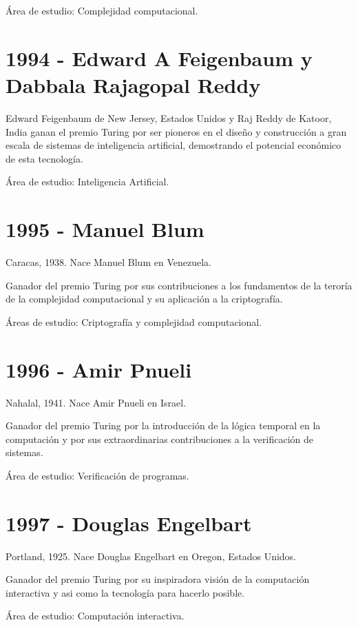 \documentclass[notitlepage,letterpaper, 11pt]{article}
\begin{document}
\noindent Área de estudio: Complejidad computacional.
\newline


\section*{1994 - Edward A Feigenbaum y Dabbala Rajagopal Reddy}
\noindent Edward Feigenbaum de New Jersey, Estados Unidos y Raj Reddy de Katoor, India ganan el premio Turing por ser pioneros en el diseño y construcción a gran escala de sistemas de inteligencia artificial, demostrando el potencial económico de esta tecnología.

\noindent Área de estudio: Inteligencia Artificial.
\newline

\section*{1995 - Manuel Blum}
\noindent Caracas, 1938. Nace Manuel Blum en Venezuela.

\noindent Ganador del premio Turing por sus contribuciones a los fundamentos de la teroría de la complejidad computacional y su aplicación a la criptografía.

\noindent Áreas de estudio: Criptografía y complejidad computacional.
\newline

\section*{1996 - Amir Pnueli}
\noindent Nahalal, 1941. Nace Amir Pnueli en Israel.

\noindent Ganador del premio Turing por la introducción de la lógica temporal en la computación y por sus extraordinarias contribuciones a la verificación de sistemas.

\noindent Área de estudio: Verificación de programas. 
\newline

\section*{1997 - Douglas Engelbart}
\noindent Portland, 1925. Nace Douglas Engelbart en Oregon, Estados Unidos.

\noindent Ganador del premio Turing por su inspiradora visión de la computación interactiva y asi como la tecnología para hacerlo posible.

\noindent Área de estudio: Computación interactiva. 
\end{document}

